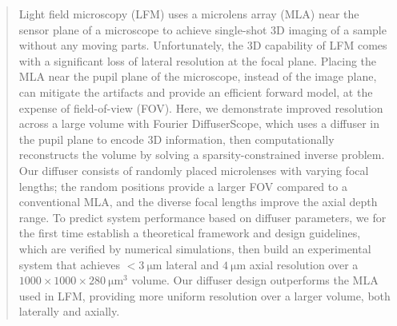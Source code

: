\documentclass{osa-article}
\begin{document}
\begin{abstract}

Light field microscopy (LFM) uses a microlens array (MLA) near the sensor plane of a microscope to achieve single-shot 3D imaging of a sample without any moving parts. Unfortunately, the 3D capability of LFM comes with a significant loss of lateral resolution at the focal plane. Placing the MLA near the pupil plane of the microscope, instead of the image plane, can mitigate the artifacts and provide an efficient forward model, at the expense of field-of-view (FOV). Here, we demonstrate improved resolution across a large volume with Fourier DiffuserScope, which uses a diffuser in the pupil plane to encode 3D information, then computationally reconstructs the volume by solving a sparsity-constrained inverse problem. Our diffuser consists of randomly placed microlenses with varying focal lengths; the random positions provide a larger FOV compared to a conventional MLA, and the diverse focal lengths improve the axial depth range. To predict system performance based on diffuser parameters, we for the first time establish a theoretical framework and design guidelines, which are verified by numerical simulations, then build an experimental system that achieves $<\SI{3}{\micro\meter}$ lateral and $\SI{4}{\micro\meter}$ axial resolution over a $1000 \times 1000 \times \SI{280}{\micro\meter \cubed}$ volume. Our diffuser design outperforms the MLA used in LFM, providing more uniform resolution over a larger volume, both laterally and axially.  
\end{abstract}
\end{document}
